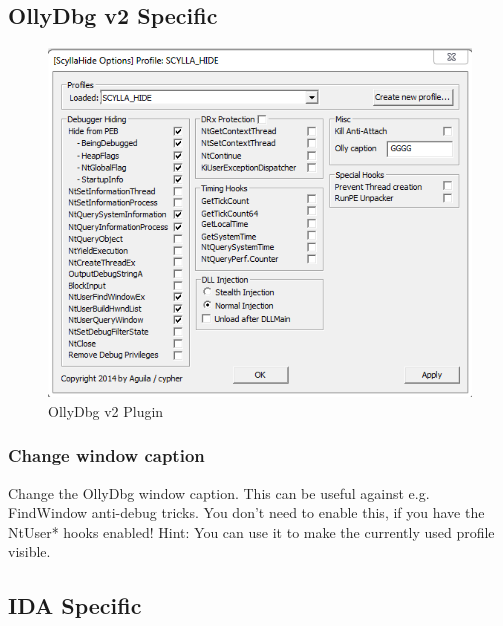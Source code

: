 \documentclass[10pt,a4paper]{article}
\begin{document}
\subsection{OllyDbg v2 Specific}

\begin{figure}[H]
\centering
\includegraphics[scale=1]{ollyv2plugin.PNG}
\caption{OllyDbg v2 Plugin}
\end{figure}

\subsubsection{Change window caption}
Change the OllyDbg window caption. This can be useful against e.g. FindWindow anti-debug tricks. You don't need to enable this, if you have the NtUser* hooks enabled! Hint: You can use it to make the currently used profile visible.

\subsection{IDA Specific}
\end{document}
